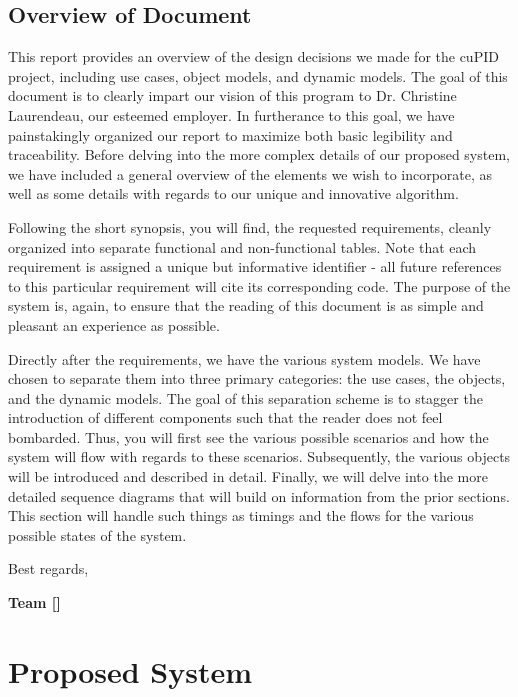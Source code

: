 \documentclass[12pt,letterpaper]{article}
\begin{document}
\subsection{Overview of Document}

This report provides an overview of the design decisions we made for the cuPID project, including 
use cases, object models, and dynamic models. The goal of this document is to clearly impart our vision of this
program to Dr. Christine Laurendeau, our esteemed employer. In furtherance to this goal, we have painstakingly 
organized our report to maximize both basic legibility and traceability. Before delving into the more complex details 
of our proposed system, we have included a general overview of the elements we wish to incorporate, as well as 
some details with regards to our unique and innovative algorithm.

Following the short synopsis, you will find, the requested requirements, cleanly organized into separate functional 
and non-functional tables. Note that each requirement is assigned a unique but informative identifier - all future references
to this particular requirement will cite its corresponding code. The purpose of the system is, again, to ensure that the
reading of this document is as simple and pleasant an experience as possible. 

Directly after the requirements, we have the various system models. We have chosen to separate them into three
primary categories: the use cases, the objects, and the dynamic models. The goal of this separation scheme is to
stagger the introduction of different components such that the reader does not feel bombarded. Thus, you will 
first see the various possible scenarios and how the system will flow with regards to these scenarios. Subsequently, 
the various objects will be introduced and described in detail. Finally, we will delve into the more detailed sequence 
diagrams that will build on information from the prior sections. This section will handle such things as timings and
the flows for the various possible states of the system.

\vspace{1em}

\noindent Best regards,

\vspace{1em}

\textbf{Team [\teamname{}]}

\newpage{}

\section{Proposed System}
\end{document}

